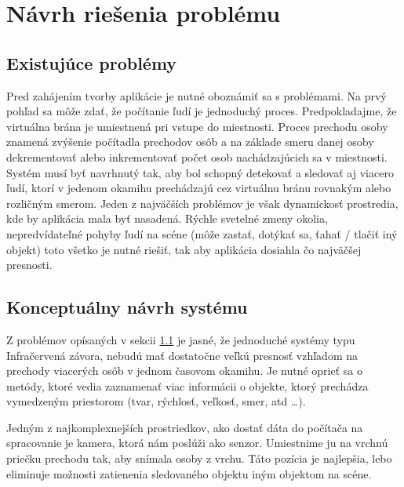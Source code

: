 

\chapter{Návrh riešenia problému}
\section{Existujúce problémy}
\label{sec:problems}
Pred zahájením tvorby aplikácie je nutné oboznámiť sa s problémami. Na prvý pohľad  sa môže zdať, že  počítanie ľudí je jednoduchý proces. Predpokladajme, že virtuálna brána je umiestnená pri vstupe do miestnosti. Proces prechodu osoby znamená zvýšenie počítadla prechodov osôb a na základe smeru danej osoby dekrementovať alebo inkrementovať počet osob nachádzajúcich sa v miestnosti. Systém musí byť navrhnutý tak, aby bol schopný detekovať a sledovať aj viacero ľudí, ktorí v jedenom okamihu prechádzajú cez virtuálnu bránu rovnakým alebo rozličným smerom.  Jeden z najväčších problémov je však dynamickosť prostredia, kde by aplikácia mala byť nasadená. Rýchle svetelné zmeny okolia,  nepredvídateľné pohyby ľudí na scéne (môže zastať, dotýkať sa, ťahať / tlačiť iný objekt)  toto všetko je nutné riešiť, tak aby aplikácia dosiahla čo najväčšej presnosti. 

\section{Konceptuálny návrh systému}
\label{sec:draft}
Z problémov opísaných v sekcii \ref{sec:problems} je jasné, že jednoduché systémy typu Infračervená závora, nebudú mať dostatočne veľkú presnosť vzhľadom na prechody viacerých osôb v jednom časovom okamihu. Je nutné oprieť sa o metódy, ktoré vedia zaznamenať viac informácii o objekte, ktorý prechádza vymedzeným priestorom (tvar, rýchlosť, veľkosť, smer, atd …). 

Jedným z najkomplexnejších prostriedkov, ako dostať dáta do počítača na spracovanie je kamera, ktorá nám poslúži ako senzor.  Umiestnime ju na vrchnú priečku prechodu tak, aby snímala osoby z vrchu. Táto pozícia je najlepšia, lebo eliminuje možnosti zatienenia sledovaného objektu iným objektom na scéne.  

